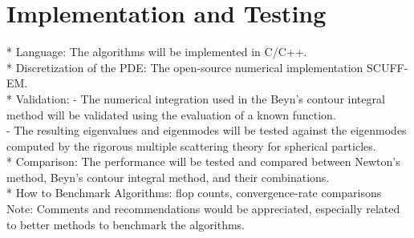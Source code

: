 \documentclass[11pt,letterpaper]{article}
\begin{document}
\section*{Implementation and Testing}
* Language: The algorithms will be implemented in C/C++.\\
* Discretization of the PDE: The open-source numerical implementation SCUFF-EM.\citep{SCUFF1}\\
* Validation: 
- The numerical integration used in the Beyn's contour integral method will be validated using the evaluation of a known function. \\
- The resulting eigenvalues and eigenmodes will be tested against the eigenmodes computed by the rigorous multiple scattering theory for spherical particles. \citep{xu1995electromagnetic}\\
* Comparison: The performance will be tested and compared between Newton's method, Beyn's contour integral method, and their combinations.  \\
* How to Benchmark Algorithms: flop counts, convergence-rate comparisons\\
Note: Comments and recommendations would be appreciated, especially related to better methods to benchmark the algorithms.  


\end{document}
